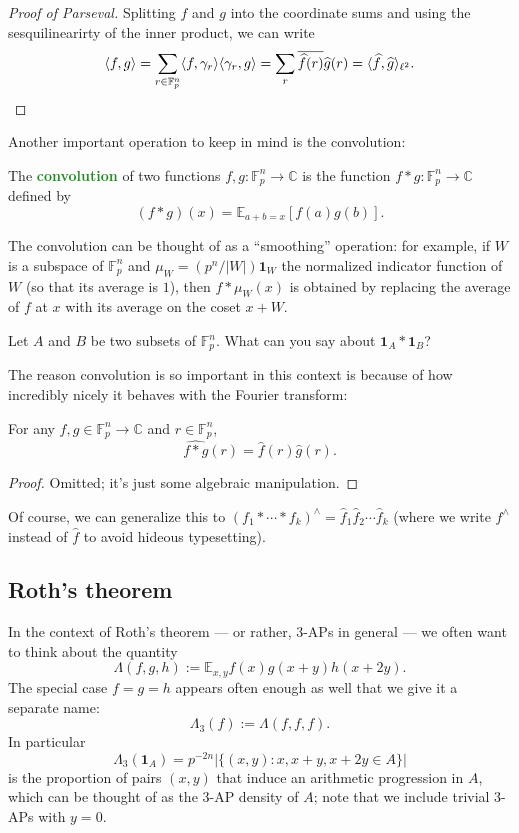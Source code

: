 \documentclass[10pt]{scrartcl}
\providecommand{\ol}{\overline}
\providecommand{\CC}{\mathbb C}
\providecommand{\EE}{\mathbb E}
\providecommand{\FF}{\mathbb F}
\providecommand{\ind}[1]{\mathbf 1_{#1}}
\providecommand{\abs}[1]{\left|{#1}\right|}
\renewcommand{\hat}{\widehat}
\providecommand{\vocab}[1]{{\textbf{\textcolor{ForestGreen}{#1}}}}
\begin{document}
\begin{proof}[Proof of Parseval]
	Splitting $f$ and $g$ into the coordinate sums and using
	the sesquilinearirty of the inner product, we can write
	\[\langle f,g\rangle = \sum_{r\in\FF_p^n}
	\langle f,\gamma_r\rangle\langle\gamma_r,g\rangle
	= \sum_r \ol{\hat f(r)}\hat g(r) = \langle \hat f,\hat g\rangle_{\ell^2}.
	\qedhere\]
\end{proof}

Another important operation to keep in mind is the convolution:
\begin{definition}[Convolution]
	The \vocab{convolution} of two functions $f,g\colon\FF_p^n\to\CC$ is
	the function $f*g\colon\FF_p^n\to\CC$ defined by
	\[(f*g)(x) = \EE_{a+b=x}[f(a)g(b)].\]
\end{definition}

\begin{example}
	The convolution can be thought of as a ``smoothing'' operation:
	for example, if $W$ is a subspace of $\FF_p^n$ and $\mu_W = (p^n/|W|)\ind W$
	the normalized indicator function of $W$ (so that its average is $1$),
	then $f*\mu_W(x)$ is obtained by replacing the average of $f$ at $x$
	with its average on the coset $x+W$.
\end{example}

\begin{exercise}
	Let $A$ and $B$ be two subsets of $\FF_p^n$. What can you say about
	$\ind A*\ind B$?
\end{exercise}

The reason convolution is so important in this context
is because of how incredibly nicely it behaves with the Fourier transform:
\begin{theorem}
	For any $f,g\in\FF_p^n\to\CC$ and $r\in\FF_p^n$,
	\[\hat{f*g}(r) = \hat f(r)\hat g(r).\]
\end{theorem}

\begin{proof}
	Omitted; it's just some algebraic manipulation.
\end{proof}

Of course, we can generalize this to $(f_1*\cdots*f_k)^\wedge =
\hat f_1\hat f_2\cdots\hat f_k$ (where we write $f^\wedge$ instead of
$\hat f$ to avoid hideous typesetting).

\subsection{Roth's theorem}
In the context of Roth's theorem --- or rather, 3-APs in general ---
we often want to think about the quantity
\[\Lambda(f,g,h) := \EE_{x,y}f(x)g(x+y)h(x+2y).\]
The special case $f=g=h$ appears often enough as well
that we give it a separate name:
\[\Lambda_3(f) := \Lambda(f,f,f).\]
In particular
\[\Lambda_3(\ind A) = p^{-2n}\abs{\{(x,y):x,x+y,x+2y\in A\}}\]
is the proportion of pairs $(x,y)$ that induce an arithmetic progression in $A$,
which can be thought of as the 3-AP density of $A$;
note that we include trivial 3-APs with $y=0$.
\end{document}
